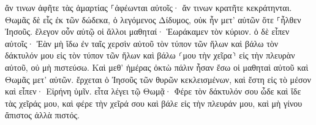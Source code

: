 \documentclass{openreader}
\begin{document}
ἄν τινων ἀφῆτε τὰς ἁμαρτίας ⸀ἀφέωνται αὐτοῖς· ἄν τινων κρατῆτε κεκράτηνται. 
Θωμᾶς δὲ εἷς ἐκ τῶν δώδεκα, ὁ λεγόμενος Δίδυμος, οὐκ ἦν μετ’ αὐτῶν ὅτε ⸀ἦλθεν Ἰησοῦς. 
ἔλεγον οὖν αὐτῷ οἱ ἄλλοι μαθηταί· Ἑωράκαμεν τὸν κύριον. ὁ δὲ εἶπεν αὐτοῖς· Ἐὰν μὴ ἴδω ἐν ταῖς χερσὶν αὐτοῦ τὸν τύπον τῶν ἥλων καὶ βάλω τὸν δάκτυλόν μου εἰς τὸν τύπον τῶν ἥλων καὶ βάλω ⸂μου τὴν χεῖρα⸃ εἰς τὴν πλευρὰν αὐτοῦ, οὐ μὴ πιστεύσω. 
Καὶ μεθ’ ἡμέρας ὀκτὼ πάλιν ἦσαν ἔσω οἱ μαθηταὶ αὐτοῦ καὶ Θωμᾶς μετ’ αὐτῶν. ἔρχεται ὁ Ἰησοῦς τῶν θυρῶν κεκλεισμένων, καὶ ἔστη εἰς τὸ μέσον καὶ εἶπεν· Εἰρήνη ὑμῖν. 
εἶτα λέγει τῷ Θωμᾷ· Φέρε τὸν δάκτυλόν σου ὧδε καὶ ἴδε τὰς χεῖράς μου, καὶ φέρε τὴν χεῖρά σου καὶ βάλε εἰς τὴν πλευράν μου, καὶ μὴ γίνου ἄπιστος ἀλλὰ πιστός. 
\end{document}

